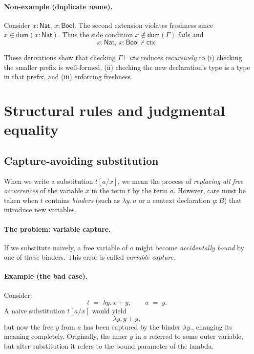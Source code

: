 \documentclass{article}
\newcommand{\Nat}{\mathsf{Nat}}
\newcommand{\Bool}{\mathsf{Bool}}
\newcommand{\ctx}{\mathsf{ctx}}            %
\newcommand{\dom}{\mathsf{dom}}            %
\begin{document}
\paragraph{Non-example (duplicate name).}
Consider \(x:\Nat,\, x:\Bool\). The second extension violates freshness since
\(x \in \dom(x:\Nat)\). Thus the side condition \(x \notin \dom(\Gamma)\) fails and
\[
x:\Nat,\, x:\Bool \not\vdash \ctx.
\]

\medskip
\noindent
These derivations show that checking \(\Gamma \vdash \ctx\) reduces \emph{recursively}
to (i) checking the smaller prefix is well-formed, (ii) checking the new
declaration’s type is a type in that prefix, and (iii) enforcing freshness.


\section{Structural rules and judgmental equality}

\subsection*{Capture-avoiding substitution}

When we write a substitution \(t[a/x]\), we mean the process of
\emph{replacing all free occurrences} of the variable \(x\) in the term \(t\)
by the term \(a\).  
However, care must be taken when \(t\) contains \emph{binders} (such as
\(\lambda y.\,u\) or a context declaration \(y\!:\!B\)) that introduce new variables.

\paragraph{The problem: variable capture.}

If we substitute naively, a free variable of \(a\) might become
\emph{accidentally bound} by one of these binders.
This error is called \emph{variable capture}.

\paragraph{Example (the bad case).}

Consider:
\[
t \;=\; \lambda y.\,x + y,
\qquad a \;=\; y.
\]
A naive substitution \(t[a/x]\) would yield
\[
\lambda y.\,y + y,
\]
but now the free \(y\) from \(a\) has been captured by the binder \(\lambda y.\),
changing its meaning completely.
Originally, the inner \(y\) in \(a\) referred to some outer variable,
but after substitution it refers to the bound parameter of the lambda.
\end{document}
